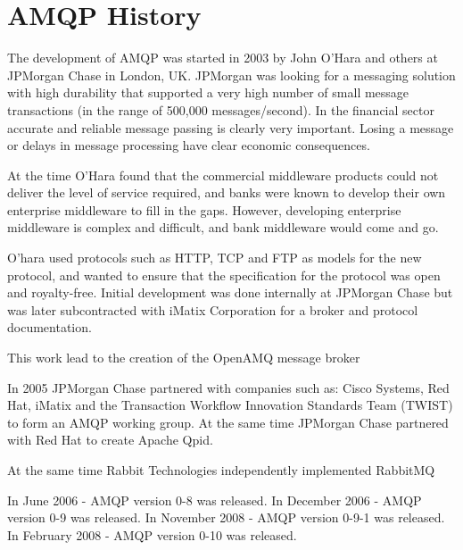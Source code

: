 \documentclass{thesis}
\begin{document}
\section{AMQP History}
The development of AMQP was started in 2003 by John O'Hara and others at JPMorgan Chase in London, UK.  JPMorgan was looking for a messaging solution with high durability that supported a very high number of small message transactions (in the range of 500,000 messages/second). %
In the financial sector accurate and reliable message passing is clearly very important.  Losing a message or delays in message processing have clear economic consequences.  

At the time O'Hara found that the commercial middleware products could not deliver the level of service required,  and banks were known to develop their own enterprise middleware to fill in the gaps. However, developing enterprise middleware is complex and difficult, and bank middleware would come and go. 

O'hara used protocols such as HTTP, TCP and FTP as models for the new protocol, and wanted to ensure that the specification for the protocol was open and royalty-free.  Initial development was done internally at JPMorgan Chase but was later subcontracted with iMatix Corporation for a broker and protocol documentation.  %

This work lead to the creation of the OpenAMQ message broker %

In 2005 JPMorgan Chase partnered with companies such as: Cisco Systems, Red Hat, iMatix and the Transaction Workflow Innovation Standards Team (TWIST) to form an AMQP working group.  At the same time JPMorgan Chase partnered with Red Hat to create Apache Qpid. %

At the same time Rabbit Technologies independently implemented RabbitMQ %

In June 2006 - AMQP version 0-8 was released. %
In December 2006 - AMQP version 0-9 was released. %
In November 2008 - AMQP version 0-9-1 was released. %
In February 2008 - AMQP version 0-10 was released. %
\end{document}
